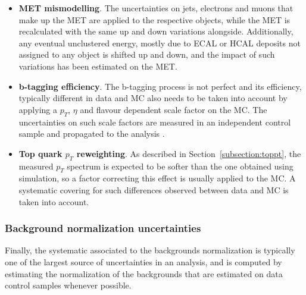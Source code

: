 \documentclass[a4paper, 10pt, openright]{report}
\begin{document}
\begin{itemize}
\item \textbf{\ac{MET} mismodelling}. The uncertainties on jets, electrons and muons that make up the \ac{MET} are applied to the respective objects, while the \ac{MET} is recalculated with the same up  and down variations alongside. Additionally, any eventual unclustered energy, mostly due to \ac{ECAL} or \ac{HCAL} deposits not assigned to any object is shifted up and down, and the impact of such variations has been estimated on the \ac{MET}.
\item \textbf{b-tagging efficiency}. The b-tagging process is not perfect and its efficiency, typically different in data and \ac{MC} also needs to be taken into account by applying a $p_T$, $\eta$ and flavour dependent scale factor on the \ac{MC}. The uncertainties on such scale factors are measured in an independent control sample and propagated to the analysis \cite{btagEff}.
\item \textbf{Top quark $p_T$ reweighting}. As described in Section~\ref{subsection:toppt}, the measured $p_T$ spectrum is expected to be softer than the one obtained using simulation, so a factor correcting this effect is usually applied to the \ac{MC}. A systematic covering for such differences observed between data and \ac{MC} is taken into account.
\end{itemize}

\subsubsection{Background normalization uncertainties}

Finally, the systematic associated to the backgrounds normalization is typically one of the largest source of uncertainties in an analysis, and is computed by estimating the normalization of the
backgrounds that are estimated on data control samples whenever possible. 
\end{document}
